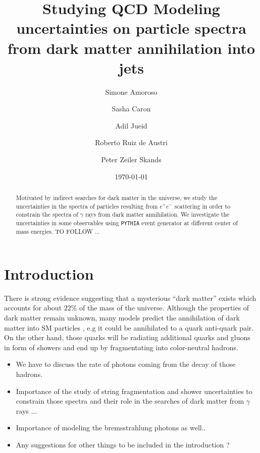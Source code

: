 \documentclass[aps,preprint,floatfix,nofootinbib,showpacs]{revtex4-1}
\begin{document}
\title{Studying QCD Modeling uncertainties on particle spectra from dark matter annihilation into jets}
\date{\today}
\author{Simone Amoroso}
\author{Sasha Caron}
\author{Adil Jueid}
\author{Roberto Ruiz de Austri}
\author{Peter Zeiler Skands}

\begin{abstract}
Motivated by indirect searches for dark matter in the universe, we study the
uncertainties in the spectra of particles resulting from $e^+ e^-$ scattering in order
to constrain the spectra of $\gamma$ rays from dark matter annihilation. 
We investigate the uncertainties in some observables using
\texttt{PYTHIA} event generator at different center of mass energies. TO FOLLOW ...
\end{abstract}


\maketitle

\section{Introduction} %
There is strong evidence suggesting that a mysterious “dark matter” exists which
accounts for about $22\%$ of the mass of the universe. Although the properties
of dark matter remain unknown, many models predict the annihilation of dark
matter into SM particles \cite{Bertone:2004pz}, e.g it could be annihilated 
to a quark anti-quark pair. On the other hand, those quarks will be radiating
additional quarks and gluons in form of showers and end up by fragmentating 
into color-neutral hadrons.
\begin{itemize}
 \item We have to discuss the rate of photons coming from the decay of those hadrons.
 \item Importance of the study of string fragmentation and shower uncertainties to constrain those spectra 
 and their role in the searches of dark matter from $\gamma$ rays ...
 \item Importance of modeling the bremsstrahlung photons as well..
 \item Any suggestions for other things to be included in the introduction ?
\end{itemize}
\end{document}
